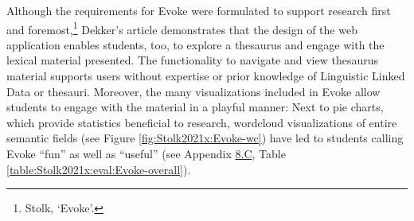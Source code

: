 Although the requirements for Evoke were formulated to support research first and foremost,\footnote{Stolk, `Evoke'.} %
Dekker's article demonstrates that the design of the web application enables students, too, to explore a thesaurus and engage with the lexical material presented. The functionality to navigate and view thesaurus material supports users without expertise or prior knowledge of Linguistic Linked Data or thesauri. Moreover, the many visualizations included in Evoke allow students to engage with the material in a playful manner: Next to pie charts, which provide statistics beneficial to research, wordcloud visualizations of entire semantic fields (see Figure \ref{fig:Stolk2021x:Evoke-wc}) have led to students calling Evoke ``fun'' as well as ``useful'' (see Appendix \hyperref[Appendix8.C]{8.C}, Table \ref{table:Stolk2021x:eval:Evoke-overall}). 

